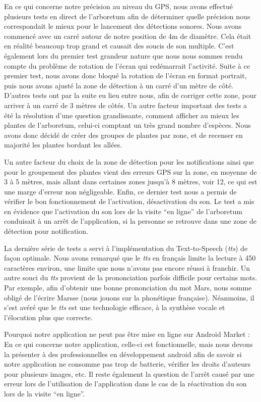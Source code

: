 \documentclass[a4paper,11pt]{article}
\begin{document}
		En ce qui concerne notre précision au niveau du GPS, nous avons effectué plusieurs tests en direct de l'arboretum afin de déterminer quelle précision nous correspondait le mieux pour le lancement des détections sonores. Nous avons commencé avec un carré autour de notre position de 4m de diamètre. Cela était en réalité beaucoup trop grand et causait des soucis de son multiple. C'est également lors du premier test grandeur nature que nous nous sommes rendu compte du problème de rotation de l'écran qui redémarrait l'activité. Suite à ce premier test, nous avons donc bloqué la rotation de l'écran en format portrait, puis nous avons ajusté la zone de détection à un carré d'un mètre de côté. D'autres tests ont par la suite eu lieu entre nous, afin de corriger cette zone, pour arriver à un carré de 3 mètres de côtés. Un autre facteur important des tests a été la résolution d'une question grandissante, comment afficher au mieux les plantes de l'arboretum, celui-ci comptant un très grand nombre d'espèces. Nous avons donc décidé de créer des groupes de plantes par zone, et de recenser en majorité les plantes bordant les allées. 
		
		Un autre facteur du choix de la zone de détection pour les notifications ainsi que pour le groupement des plantes vient des erreurs GPS sur la zone, en moyenne de 3 à 5 mètres, mais allant dans certaines zones jusqu'à 8 mètres, voir 12, ce qui est une marge d'erreur non négligeable. Enfin, ce dernier test nous a permis de vérifier le bon fonctionnement de l'activation, désactivation du son. Le test a mis en évidence que l'activation du son lors de la visite ``en ligne'' de l'arboretum conduisait à un arrêt de l'application, si la personne se retrouve dans une zone de détection pour notification.
		
		La dernière série de tests a servi à l'implémentation du Text-to-Speech (\emph{tts}) de façon optimale. Nous avons remarqué que le \emph{tts} en français limite la lecture à 450 caractères environ, une limite que nous n'avons pas encore réussi à franchir. Un autre souci du \emph{tts} provient de la prononciation parfois difficile pour certains mots. Par exemple, afin d'obtenir une bonne prononciation du mot Mars, nous somme obligé de l'écrire Marsse (nous jouons sur la phonétique française). Néanmoins, il s'est avéré que le \emph{tts} est une technologie efficace, à la synthèse vocale et l’élocution plus que correcte.
		
		Pourquoi notre application ne peut pas être mise en ligne sur Android Market : 
En ce qui concerne notre application, celle-ci est fonctionnelle, mais nous devons la présenter à des professionnelles en développement android afin de savoir si notre application ne consomme pas trop de batterie, vérifier les droits d'auteurs pour plusieurs images, etc. Il reste également la question de l'arrêt causé par une erreur lors de l'utilisation de l'application dans le cas de la réactivation du son lors de la visite ``en ligne''.
\end{document}
